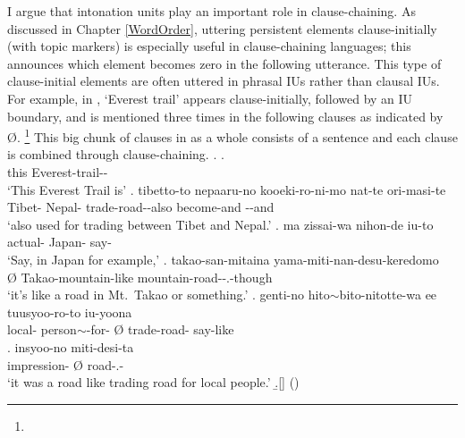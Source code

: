 I argue that intonation units play an important role in clause-chaining.
As discussed in Chapter \ref{WordOrder},
uttering persistent elements clause-initially (with topic markers) is especially useful in clause-chaining languages;
this announces which element becomes zero in the following utterance.
This type of clause-initial elements are often uttered in phrasal IUs rather than clausal IUs.
For example, in \Next,
 `Everest trail' appears clause-initially,
followed by an IU boundary,
and is mentioned three times in the following clauses as indicated by {\O}.%
 \footnote{
 }
This big chunk of clauses in \Next as a whole consists of a sentence and
each clause is combined through clause-chaining.
%
\ex.
\ag.   {\tp{\dvline}} \\
	this Everest-trail-- {} \\
	`{This Everest Trail} is'
\bg. tibetto-to nepaaru-no \tp{\dvline} kooeki-ro-ni-mo nat-te ori-masi-te\tp{\dvline} \\
	Tibet- Nepal- {} trade-road--also become-and --and \\
	`also used for trading  between Tibet and Nepal.'
\cg. ma zissai-wa nihon-de iu-to \tp{\dvline} \\
	 actual- Japan- say- {} \\
	`Say, in Japan for example,'
\dg. \EM{\O} takao-san-mitaina \tp{\dvline} yama-miti-nan-desu-keredomo \tp{\dvline} \\
	{\O} Takao-mountain-like {} mountain-road--.-though {} \\
	`it's like a road in Mt.\ Takao or something.'
\eg. genti-no hito$\sim$bito-nitotte-wa \tp{\dvline} ee \tp{\dvline} \EM{\O} tuusyoo-ro-to \tp{\dvline} iu-yoona \\
	local- person$\sim$-for- {}  {} {\O} trade-road- {} say-like \\
\bg. insyoo-no \EM{\O} miti-desi-ta \tp{\dvline} \\
	 impression- {\O} road-.- {} \\
 `{it} was a road like trading road for local people.'
 \b.[] \hfill{()}

